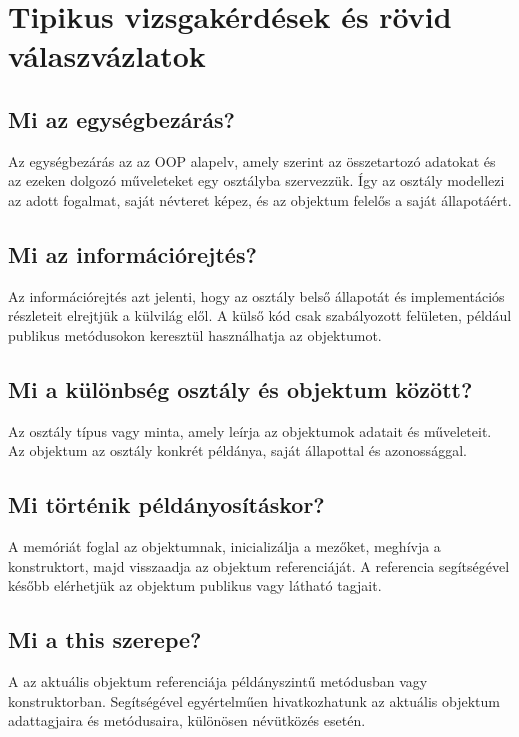 \section{Tipikus vizsgakérdések és rövid válaszvázlatok}

\subsection{Mi az egységbezárás?}

Az egységbezárás az az OOP alapelv, amely szerint az összetartozó adatokat és az ezeken dolgozó műveleteket egy osztályba szervezzük. Így az osztály modellezi az adott fogalmat, saját névteret képez, és az objektum felelős a saját állapotáért.

\subsection{Mi az információrejtés?}

Az információrejtés azt jelenti, hogy az osztály belső állapotát és implementációs részleteit elrejtjük a külvilág elől. A külső kód csak szabályozott felületen, például publikus metódusokon keresztül használhatja az objektumot.

\subsection{Mi a különbség osztály és objektum között?}

Az osztály típus vagy minta, amely leírja az objektumok adatait és műveleteit. Az objektum az osztály konkrét példánya, saját állapottal és azonossággal.

\subsection{Mi történik példányosításkor?}

A  memóriát foglal az objektumnak, inicializálja a mezőket, meghívja a konstruktort, majd visszaadja az objektum referenciáját. A referencia segítségével később elérhetjük az objektum publikus vagy látható tagjait.

\subsection{Mi a this szerepe?}

A  az aktuális objektum referenciája példányszintű metódusban vagy konstruktorban. Segítségével egyértelműen hivatkozhatunk az aktuális objektum adattagjaira és metódusaira, különösen névütközés esetén.

